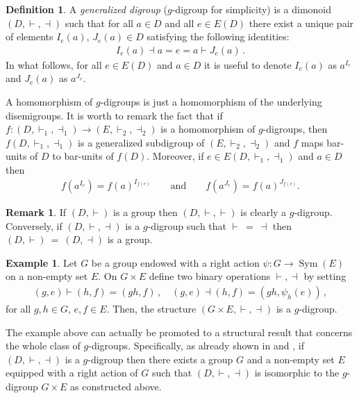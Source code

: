 \documentclass[preprint,1p]{elsarticle}
\numberwithin{equation}{section}
\theoremstyle{definition}               %
\newtheorem{defin}[theor]{Definition}
\newtheorem{ex}[theor]{Example}
\newtheorem{rem}[theor]{Remark}
\newcommand{\vd}{\vdash}
\newcommand{\dv}{\dashv}
\DeclareMathOperator{\Sym}{Sym}
\begin{document}
\begin{defin}
    A \emph{generalized digroup} ($g$-digroup for simplicity) is a dimonoid $(D,\vd,\dv)$ such that for all $a \in D$ and all $e \in E(D)$ there exist  a unique pair of elements $I_e(a)$, $J_e(a) \in D$ satisfying the following identities:
    \begin{align}
        I_e(a) \dv a = e = a \vd J_e(a) \,.\label{def:inverse}
    \end{align}
    In what follows, for all $e \in E(D)$ and $a \in D$ it is useful to denote $I_e(a)$ as $a^{I_e}$ and $J_e(a)$ as $a^{J_e}$.
\end{defin}

A homomorphism of $g$-digroups is just a homomorphism of the underlying disemigroups.
It is worth to remark the fact that if $f:(D,\vd_1,\dv_1) \to (E,\vd_2,\dv_2)$ is a homomorphism of $g$-digroups, then $f(D,\vd_1,\dv_1)$ is a generalized subdigroup of $(E,\vd_2,\dv_2)$ and $f$ maps bar-units of $D$ to bar-units of $f(D)$.
Moreover, if $e \in E(D,\vd_1,\dv_1)$ and $a \in D$ then
\begin{align*}
        f(a^{I_e}) = f(a)^{I_{f(e)}} 
        \qquad \text{and}\qquad
        f(a^{J_e}) = f(a)^{J_{f(e)}}.
    \end{align*}

\begin{rem}\label{rem:dig-group}
    If $(D,\vd)$ is a group then $(D,\vd,\vd)$ is clearly a $g$-digroup.
    Conversely, if $(D,\vd,\dv)$ is a $g$-digroup such that $\vd\ =\ \dv$ then $(D,\vd) \ = \ (D,\dv)$ is a group.
\end{rem}

\begin{ex}\label{ex:digroup}
    Let $G$ be a group endowed with a right action $\psi:G \to \Sym(E)$ on a non-empty set $E$.
    On $G \times E$ define two binary operations $\vd,\dv$ by setting
    \begin{align*}
        (g,e) \vd (h,f) = (gh,f) 
        \,,\quad 
        (g,e) \dv (h,f) = (gh,\psi_h(e)) \,,
    \end{align*}
    for all $g,h \in G$, $e,f \in E$.
    Then, the structure $(G \times E,\vd,\dv)$ is a $g$-digroup.
\end{ex}

The example above can actually be promoted to a structural result that concerns the whole class of $g$-digroups.
Specifically, as already shown in \cite{Kin07} and \cite{Diaz16}, if $(D,\vd,\dv)$ is a $g$-digroup then there exists a group $G$ and a non-empty set $E$ equipped with a right action of $G$ such that $(D,\vd,\dv)$ is isomorphic to the $g$-digroup $G \times E$ as constructed above.
\end{document}

